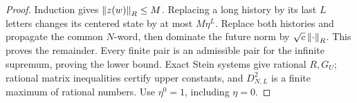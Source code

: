 \begin{proof}
Induction gives $\left\lVert z(w)\right\rVert_R\le M$. Replacing a long history by its last $L$ letters changes its centered state by at most $M\eta^L$. Replace both histories and propagate the common $N$-word, then dominate the future norm by $\sqrt c\left\lVert\cdot\right\rVert_R$. This proves the remainder. Every finite pair is an admissible pair for the infinite supremum, proving the lower bound. Exact Stein systems give rational $R,G_U$; rational matrix inequalities certify upper constants, and $D_{N,L}^2$ is a finite maximum of rational numbers. Use $\eta^0=1$, including $\eta=0$.
\end{proof}
